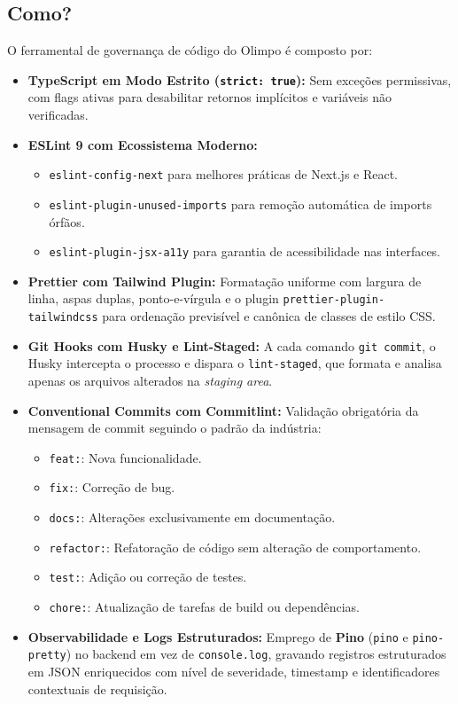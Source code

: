 \documentclass[12pt,a4paper]{article}
\begin{document}
\subsection{Como?}
O ferramental de governança de código do Olimpo é composto por:
\begin{itemize}
  \item \textbf{TypeScript em Modo Estrito (\texttt{strict: true}):} Sem exceções permissivas, com flags ativas para desabilitar retornos implícitos e variáveis não verificadas.
  \item \textbf{ESLint 9 com Ecossistema Moderno:}
  \begin{itemize}
    \item \texttt{eslint-config-next} para melhores práticas de Next.js e React.
    \item \texttt{eslint-plugin-unused-imports} para remoção automática de imports órfãos.
    \item \texttt{eslint-plugin-jsx-a11y} para garantia de acessibilidade nas interfaces.
  \end{itemize}
  \item \textbf{Prettier com Tailwind Plugin:} Formatação uniforme com largura de linha, aspas duplas, ponto-e-vírgula e o plugin \texttt{prettier-plugin-tailwindcss} para ordenação previsível e canônica de classes de estilo CSS.
  \item \textbf{Git Hooks com Husky e Lint-Staged:} A cada comando \texttt{git commit}, o Husky intercepta o processo e dispara o \texttt{lint-staged}, que formata e analisa apenas os arquivos alterados na \textit{staging area}.
  \item \textbf{Conventional Commits com Commitlint:} Validação obrigatória da mensagem de commit seguindo o padrão da indústria:
  \begin{itemize}
    \item \texttt{feat:}: Nova funcionalidade.
    \item \texttt{fix:}: Correção de bug.
    \item \texttt{docs:}: Alterações exclusivamente em documentação.
    \item \texttt{refactor:}: Refatoração de código sem alteração de comportamento.
    \item \texttt{test:}: Adição ou correção de testes.
    \item \texttt{chore:}: Atualização de tarefas de build ou dependências.
  \end{itemize}
  \item \textbf{Observabilidade e Logs Estruturados:} Emprego de \textbf{Pino} (\texttt{pino} e \texttt{pino-pretty}) no backend em vez de \texttt{console.log}, gravando registros estruturados em JSON enriquecidos com nível de severidade, timestamp e identificadores contextuais de requisição.
\end{itemize}
\end{document}
